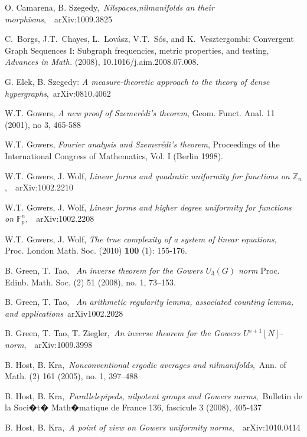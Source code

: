 \documentclass [11pt] {article}
\begin{document}
\begin{thebibliography}{99}


O. Camarena, B. Szegedy,~{\it Nilspaces,nilmanifolds an their morphisms},~~arXiv:1009.3825

C.~Borgs, J.T.~Chayes, L.~Lov\'asz, V.T.~S\'os, and K.~Vesztergombi:
Convergent Graph Sequences I: Subgraph frequencies, metric
properties, and testing, {\it Advances in Math.} (2008),
10.1016/j.aim.2008.07.008.

G. Elek, B. Szegedy: {\it A measure-theoretic approach to the theory of dense hypergraphs},~arXiv:0810.4062

W.T. Gowers, {\it A new proof of Szemer\'edi's theorem}, Geom. Funct. Anal. 11 (2001), no 3, 465-588

W.T. Gowers, {\it Fourier analysis and Szemer\'edi's theorem}, Proceedings of the International Congress of Mathematics, Vol. I (Berlin 1998).

W.T. Gowers, J. Wolf, {\it Linear forms and quadratic uniformity for functions on $\mathbb{Z}_n$},~~arXiv:1002.2210

W.T. Gowers, J. Wolf, {\it Linear forms and higher degree uniformity for functions on $\mathbb{F}_p^n$},~~arXiv:1002.2208

W.T. Gowers, J. Wolf, {\it The true complexity of a system of linear equations},~~ Proc. London Math. Soc.  (2010) {\bf 100}  (1):  155-176. 

 B. Green, T. Tao,~ {\it An inverse theorem for the Gowers $U_3(G)$ norm} Proc. Edinb. Math. Soc. (2) 51 (2008), no. 1, 73--153.

B. Green, T. Tao,~ {\it An arithmetic regularity lemma, associated counting lemma, and applications}~arXiv1002.2028

 B. Green, T. Tao, T. Ziegler,~{\it An inverse theorem for the Gowers $U^{s+1}[N]$-norm},~~arXiv:1009.3998

B. Host, B. Kra,~{\it Nonconventional ergodic averages and nilmanifolds},~Ann. of Math. (2) 161 (2005), no. 1, 397--488

B. Host, B. Kra,~{\it Parallelepipeds, nilpotent groups and Gowers norms},~Bulletin de la Soci�t� Math�matique de France 136, fascicule 3 (2008), 405-437

B. Host, B. Kra,~{\it A point of view on Gowers uniformity norms},~~arXiv:1010.0414


\end{thebibliography}
\end{document}
